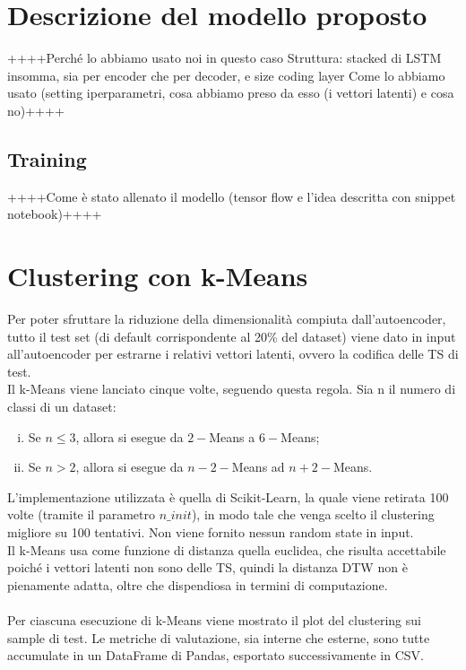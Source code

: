 \section{Descrizione del modello proposto}
++++Perché lo abbiamo usato noi in questo caso
Struttura: stacked di LSTM insomma, sia per encoder che per decoder, e size coding layer
Come lo abbiamo usato (setting iperparametri, cosa abbiamo preso da esso (i vettori latenti) e cosa no)++++

\subsection{Training}
++++Come è stato allenato il modello (tensor flow e l'idea descritta con snippet notebook)++++

\section{Clustering con k-Means}
Per poter sfruttare la riduzione della dimensionalità compiuta dall'autoencoder, tutto il test set (di default corrispondente al 20\% del dataset) viene dato in input all'autoencoder per estrarne i relativi vettori latenti, ovvero la codifica delle TS di test.\\
Il k-Means viene lanciato cinque volte, seguendo questa regola. Sia n il numero di classi di un dataset:
\begin{enumerate}[(i)]
	\item Se $n\leq3$, allora si esegue da $2-$Means a $6-$Means;
	\item Se $n>2$, allora si esegue da $n-2-$Means ad $n+2-$Means.
\end{enumerate}
L'implementazione utilizzata è quella di Scikit-Learn, la quale viene retirata 100 volte (tramite il parametro $n\_init$), in modo tale che venga scelto il clustering migliore su 100 tentativi. Non viene fornito nessun random state in input.\\
Il k-Means usa come funzione di distanza quella euclidea, che risulta accettabile poiché i vettori latenti non sono delle TS, quindi la distanza DTW non è pienamente adatta, oltre che dispendiosa in termini di computazione.\\
\\
Per ciascuna esecuzione di k-Means viene mostrato il plot del clustering sui sample di test. Le metriche di valutazione, sia interne che esterne, sono tutte accumulate in un DataFrame di Pandas, esportato successivamente in CSV.


